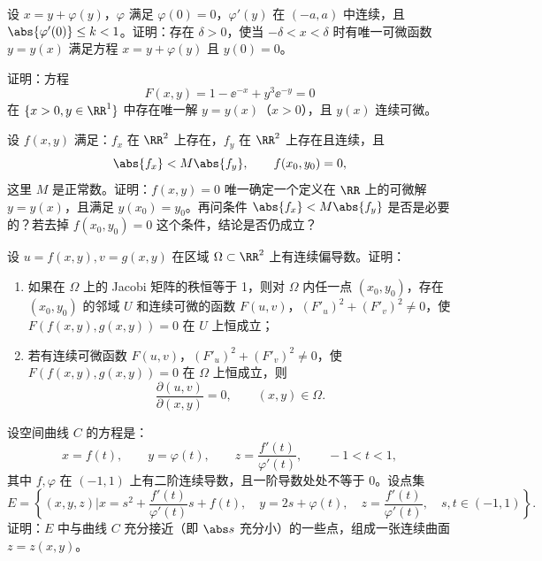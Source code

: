 \begin{xreferenceproblem}[3]
设 $x=y+\varphi(y)$，$\varphi$ 满足 $\varphi(0)=0$，$\varphi'(y)$ 在 $(-a,a)$ 中连续，且 $\abs{\varphi'(0)}\le k<1$。证明：存在 $\delta>0$，使当 $-\delta<x<\delta$ 时有唯一可微函数 $y=y(x)$ 满足方程 $x=y+\varphi(y)$ 且 $y(0)=0$。
\end{xreferenceproblem}

\begin{xreferenceproblem}[4]
证明：方程
  \[
    F(x,y)=1-\ee^{-x}+y^3\ee^{-y}=0
  \]
  在 $\{x>0,y\in\RR^1\}$ 中存在唯一解 $y=y(x)$（$x>0$），且 $y(x)$ 连续可微。
\end{xreferenceproblem}

\begin{xreferenceproblem}[5]
设 $f(x,y)$ 满足：$f_x$ 在 $\RR^2$ 上存在，$f_y$ 在 $\RR^2$ 上存在且连续，且
  \[
    \abs{f_x}<M\abs{f_y},\qquad f(x_0,y_0)=0,
  \]
  这里 $M$ 是正常数。证明：$f(x,y)=0$ 唯一确定一个定义在 $\RR$ 上的可微解 $y=y(x)$，且满足 $y(x_0)=y_0$。再问条件 $\abs{f_x}<M\abs{f_y}$ 是否是必要的？若去掉 $f(x_0,y_0)=0$ 这个条件，结论是否仍成立？
\end{xreferenceproblem}

\begin{xreferenceproblem}[6]
设 $u=f(x,y),v=g(x,y)$ 在区域 $\Omega\subset\RR^2$ 上有连续偏导数。证明：
  \begin{enumerate}[label=(\arabic*)]
    \item 如果在 $\Omega$ 上的 Jacobi 矩阵的秩恒等于 1，则对 $\Omega$ 内任一点 $(x_0,y_0)$，存在 $(x_0,y_0)$ 的邻域 $U$ 和连续可微的函数 $F(u,v)$，$(F'_u)^2+(F'_v)^2\ne0$，使 $F(f(x,y),g(x,y))=0$ 在 $U$ 上恒成立；
    \item 若有连续可微函数 $F(u,v)$，$(F'_u)^2+(F'_v)^2\ne0$，使 $F(f(x,y),g(x,y))=0$ 在 $\Omega$ 上恒成立，则
    \[
      \frac{\partial(u,v)}{\partial(x,y)}=0,\qquad (x,y)\in\Omega.
    \]
  \end{enumerate}
\end{xreferenceproblem}

\begin{xreferenceproblem}[7]
设空间曲线 $C$ 的方程是：
  \[
    x=f(t),\qquad y=\varphi(t),\qquad z=\frac{f'(t)}{\varphi'(t)},\qquad -1<t<1,
  \]
  其中 $f,\varphi$ 在 $(-1,1)$ 上有二阶连续导数，且一阶导数处处不等于 0。设点集
  \[
    E=\left\{(x,y,z)\mathrel{\Big|}
      x=s^2+\frac{f'(t)}{\varphi'(t)}s+f(t),\quad
      y=2s+\varphi(t),\quad
      z=\frac{f'(t)}{\varphi'(t)},\quad s,t\in(-1,1)\right\}.
  \]
  证明：$E$ 中与曲线 $C$ 充分接近（即 $\abs s$ 充分小）的一些点，组成一张连续曲面 $z=z(x,y)$。
\end{xreferenceproblem}

